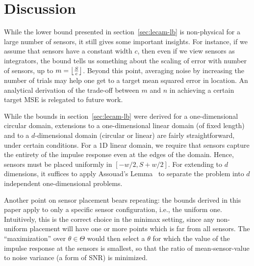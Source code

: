 \documentclass[conference]{IEEEtran}
\providecommand{\v}{}
\renewcommand{\v}[1]{\underline{#1}}
\providecommand{\vhat}{}
\renewcommand{\vhat}[1]{\underline{\hat{#1}}}
\DeclarePairedDelimiter\norm{\lVert}{\rVert}
\DeclarePairedDelimiter\floor{\lfloor}{\rfloor}
\newcommand{\Phiorho}{\Phi\!\circ\!\rho}
\begin{document}


\section{Discussion}
\label{sec:discussion}

While the lower bound presented in section~\ref{sec:lecam-lb} is non-physical
for a large number of sensors, it still gives some important insights. For
instance, if we assume that sensors have a constant width $c$, then even if we
view sensors as integrators, the bound tells us something about the scaling of
error with number of sensors, up to $m = \floor*{\frac{S}{c}}$. Beyond this
point, averaging noise by increasing the number of trials may help one get to a
target mean squared error in location. An analytical derivation of the
trade-off between $m$ and $n$ in achieving a certain target MSE is relegated to
future work.

While the bounds in section~\ref{sec:lecam-lb} were derived for a
one-dimensional circular domain, extensions to a one-dimensional linear domain
(of fixed length) and to a $d$-dimensional domain (circular or linear) are
fairly straightforward, under certain conditions. For a 1D linear domain, we
require that sensors capture the entirety of the impulse response even at the
edges of the domain. Hence, sensors must be placed uniformly in $[-w/2,
S{+}w/2]$. For extending to $d$ dimensions, it suffices to apply Assouad's
Lemma~\cite{Tsybakov2009Introduction} to separate the problem into $d$
independent one-dimensional problems.

Another point on sensor placement bears repeating: the bounds derived in this
paper apply to only a specific sensor configuration, i.e., the uniform one.
Intuitively, this is the correct choice in the minimax setting, since any
non-uniform placement will have one or more points which is far from all
sensors. The ``maximization'' over $\theta \in \Theta$ would then select a
$\theta$ for which the value of the impulse response at the sensors is
smallest, so that the ratio of mean-sensor-value to noise variance (a form of
SNR) is minimized.
\end{document}
